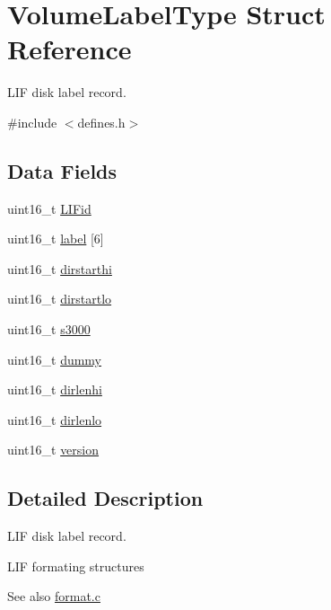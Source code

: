 \hypertarget{structVolumeLabelType}{}\section{Volume\+Label\+Type Struct Reference}
\label{structVolumeLabelType}


L\+IF disk label record.  




{\ttfamily \#include $<$defines.\+h$>$}

\subsection*{Data Fields}
\begin{DoxyCompactItemize}
\item 
uint16\+\_\+t \hyperlink{structVolumeLabelType_a16bdde2d19114ac3238477c29fe75b4a}{L\+I\+Fid}
\item 
uint16\+\_\+t \hyperlink{structVolumeLabelType_a265fc834b203868cc48482a8be64f60c}{label} \mbox{[}6\mbox{]}
\item 
uint16\+\_\+t \hyperlink{structVolumeLabelType_aac87a089bec0cf282bf23038937d7635}{dirstarthi}
\item 
uint16\+\_\+t \hyperlink{structVolumeLabelType_a193c89f442656a080244f284f1bc008a}{dirstartlo}
\item 
uint16\+\_\+t \hyperlink{structVolumeLabelType_ac7659e37fbb2bcb0b66c0a0172f9b16c}{s3000}
\item 
uint16\+\_\+t \hyperlink{structVolumeLabelType_affbd520c08374524f13708acc05f3f4e}{dummy}
\item 
uint16\+\_\+t \hyperlink{structVolumeLabelType_a6fa349ef78a7ea0a3006e0c1f4f3a155}{dirlenhi}
\item 
uint16\+\_\+t \hyperlink{structVolumeLabelType_ae1c5205294bf4588b931057d03853d66}{dirlenlo}
\item 
uint16\+\_\+t \hyperlink{structVolumeLabelType_a59f56fd1f28549bc625aeaaa57c8d0d2}{version}
\end{DoxyCompactItemize}


\subsection{Detailed Description}
L\+IF disk label record. 

L\+IF formating structures \begin{DoxySeeAlso}{See also}
\hyperlink{format_8c}{format.\+c} 
\end{DoxySeeAlso}



